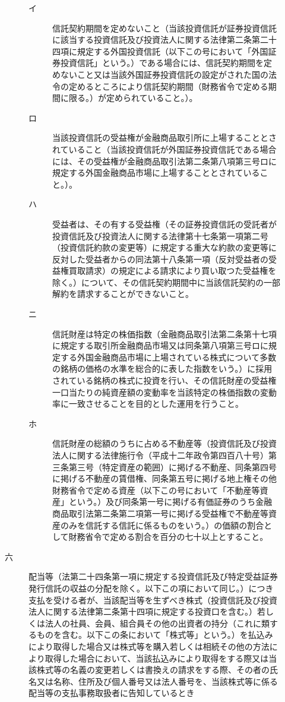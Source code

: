 \documentclass[twocolumn,a4j,10pt]{ltjtarticle}
\begin{document}
\begin{description}
\begin{description}
\begin{description}
\item[イ]信託契約期間を定めないこと（当該投資信託が証券投資信託に該当する投資信託及び投資法人に関する法律第二条第二十四項に規定する外国投資信託（以下この号において「外国証券投資信託」という。）である場合には、信託契約期間を定めないこと又は当該外国証券投資信託の設定がされた国の法令の定めるところにより信託契約期間（財務省令で定める期間に限る。）が定められていること。）。
\item[ロ]当該投資信託の受益権が金融商品取引所に上場することとされていること（当該投資信託が外国証券投資信託である場合には、その受益権が金融商品取引法第二条第八項第三号ロに規定する外国金融商品市場に上場することとされていること。）。
\item[ハ]受益者は、その有する受益権（その証券投資信託の受託者が投資信託及び投資法人に関する法律第十七条第一項第二号（投資信託約款の変更等）に規定する重大な約款の変更等に反対した受益者からの同法第十八条第一項（反対受益者の受益権買取請求）の規定による請求により買い取つた受益権を除く。）について、その信託契約期間中に当該信託契約の一部解約を請求することができないこと。
\item[ニ]信託財産は特定の株価指数（金融商品取引法第二条第十七項に規定する取引所金融商品市場又は同条第八項第三号ロに規定する外国金融商品市場に上場されている株式について多数の銘柄の価格の水準を総合的に表した指数をいう。）に採用されている銘柄の株式に投資を行い、その信託財産の受益権一口当たりの純資産額の変動率を当該特定の株価指数の変動率に一致させることを目的とした運用を行うこと。
\item[ホ]信託財産の総額のうちに占める不動産等（投資信託及び投資法人に関する法律施行令（平成十二年政令第四百八十号）第三条第三号（特定資産の範囲）に掲げる不動産、同条第四号に掲げる不動産の賃借権、同条第五号に掲げる地上権その他財務省令で定める資産（以下この号において「不動産等資産」という。）及び同条第一号に掲げる有価証券のうち金融商品取引法第二条第二項第一号に掲げる受益権で不動産等資産のみを信託する信託に係るものをいう。）の価額の割合として財務省令で定める割合を百分の七十以上とすること。
\end{description}
\item[六]配当等（法第二十四条第一項に規定する投資信託及び特定受益証券発行信託の収益の分配を除く。以下この項において同じ。）につき支払を受ける者が、当該配当等を生ずべき株式（投資信託及び投資法人に関する法律第二条第十四項に規定する投資口を含む。）若しくは法人の社員、会員、組合員その他の出資者の持分（これに類するものを含む。以下この条において「株式等」という。）を払込みにより取得した場合又は株式等を購入若しくは相続その他の方法により取得した場合において、当該払込みにより取得をする際又は当該株式等の名義の変更若しくは書換えの請求をする際、その者の氏名又は名称、住所及び個人番号又は法人番号を、当該株式等に係る配当等の支払事務取扱者に告知しているとき

\end{description}
\end{description}
\end{document}
